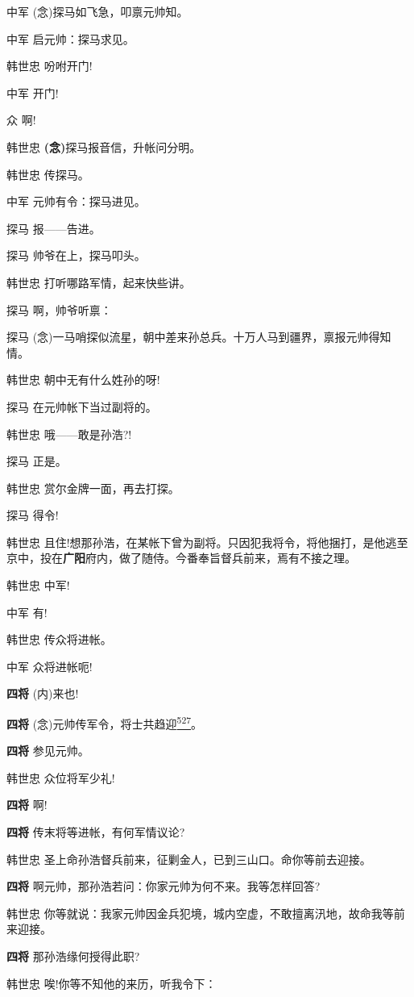 中军 (念)探马如飞急，叩禀元帅知。

中军 启元帅：探马求见。

韩世忠 吩咐开门!

中军 开门!

众 啊!

韩世忠 \textbf{(念)}探马报音信，升帐问分明。

韩世忠 传探马。

中军 元帅有令：探马进见。

探马 报------告进。

探马 帅爷在上，探马叩头。

韩世忠 打听哪路军情，起来快些讲。

探马 啊，帅爷听禀：

探马
(念)一马哨探似流星，朝中差来孙总兵。十万人马到疆界，禀报元帅得知情。

韩世忠 朝中无有什么姓孙的呀!

探马 在元帅帐下当过副将的。

韩世忠 哦------敢是孙浩?!

探马 正是。

韩世忠 赏尔金牌一面，再去打探。

探马 得令!

韩世忠
且住!想那孙浩，在某帐下曾为副将。只因犯我将令，将他捆打，是他逃至京中，投在\textbf{广阳}府内，做了随侍。今番奉旨督兵前来，焉有不接之理。

韩世忠 中军!

中军 有!

韩世忠 传众将进帐。

中军 众将进帐呃!

\textbf{四将} (内)来也!

\textbf{四将}
(念)元帅传军令，将士共趋迎\protect\hyperlink{fn527}{\textsuperscript{527}}。

\textbf{四将} 参见元帅。

韩世忠 众位将军少礼!

\textbf{四将} 啊!

\textbf{四将} 传末将等进帐，有何军情议论?

韩世忠 圣上命孙浩督兵前来，征剿金人，已到三山口。命你等前去迎接。

\textbf{四将} 啊元帅，那孙浩若问：你家元帅为何不来。我等怎样回答?

韩世忠
你等就说：我家元帅因金兵犯境，城内空虚，不敢擅离汛地，故命我等前来迎接。

\textbf{四将} 那孙浩缘何授得此职?

韩世忠 唉!你等不知他的来历，听我令下：

